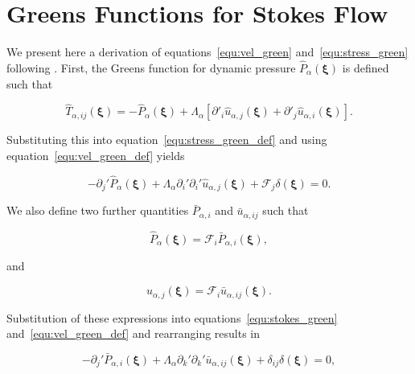 \documentclass[12pt]{article}
\begin{document}
\section{Greens Functions for Stokes Flow}
\label{app:Greens}

We present here a derivation of equations~\ref{equ:vel_green} and~\ref{equ:stress_green} following \citet{Ladyzhenskaya63}. First, the Greens function for dynamic pressure $\hat{P}_{\alpha}(\boldsymbol{\xi})$ is defined such that

\begin{equation}
\label{equ:press_green_def}
\hat{T}_{\alpha, ij}(\boldsymbol{\xi}) = - \hat{P}_{\alpha}(\boldsymbol{\xi}) + \Lambda_{\alpha}[\partial'_{i} \hat{u}_{\alpha,j}(\boldsymbol{\xi}) + \partial'_{j} \hat{u}_{\alpha,i}(\boldsymbol{\xi})] .
\end{equation}


Substituting this into equation~\ref{equ:stress_green_def} and using equation~\ref{equ:vel_green_def} yields 

\begin{equation}
\label{equ:stokes_green}
-\partial_{j}' \hat{P}_{\alpha}(\boldsymbol{\xi}) + \Lambda_{\alpha} \partial_{i}' \partial_{i}' \hat{u}_{\alpha,j}(\boldsymbol{\xi}) + \mathcal{F}_{j} \delta(\boldsymbol{\xi}) = 0 .
\end{equation}


We also define two further quantities $\bar{P}_{\alpha, i}$ and $\bar{u}_{\alpha,ij}$ such that

\begin{equation}
\label{equ:pres_bar}
\hat{P}_{\alpha} (\boldsymbol{\xi}) = \mathcal{F}_{i} \bar{P}_{\alpha, i} (\boldsymbol{\xi}) ,
\end{equation}

and 

\begin{equation}
\label{equ:vel_bar}
\hat{u}_{\alpha,j}(\boldsymbol{\xi}) = \mathcal{F}_{i} \bar{u}_{\alpha,ij} (\boldsymbol{\xi}) .
\end{equation}

Substitution of these expressions into equations~\ref{equ:stokes_green} and~\ref{equ:vel_green_def} and rearranging results in

\begin{equation}
\label{equ:stokes_bar}
-\partial_{j}' \bar{P}_{\alpha, i} (\boldsymbol\xi) + \Lambda_{\alpha} \partial_{k}' \partial_{k}' \bar{u}_{\alpha,ij} (\boldsymbol\xi) + \delta_{ij} \delta(\boldsymbol\xi) = 0 ,
\end{equation}
\end{document}
